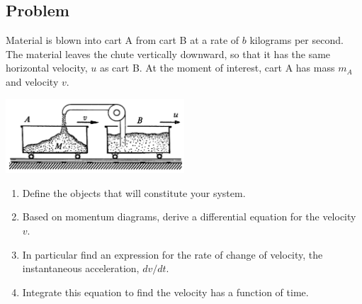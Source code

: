 \documentclass[solutions]{esg8012pset}
\begin{document}
\subsection*{Problem}
  Material is blown into cart A from cart B at a rate of $b$ kilograms per second. The material leaves the chute vertically downward, so that it has the same horizontal velocity, $u$ as cart B. At the moment of interest, cart A has mass $m_A$ and velocity $v$.
  \begin{center}\includegraphics[width=0.5\textwidth]{ps_04_2}\end{center}
  \begin{enumerate}
    \item Define the objects that will constitute your system.
    \item Based on momentum diagrams, derive a differential equation for the velocity $v$.
    \item In particular find an expression for the rate of change of velocity, the instantaneous acceleration, $d v / d t$.
    \item Integrate this equation to find the velocity has a function of time.
  \end{enumerate}
\end{document}
